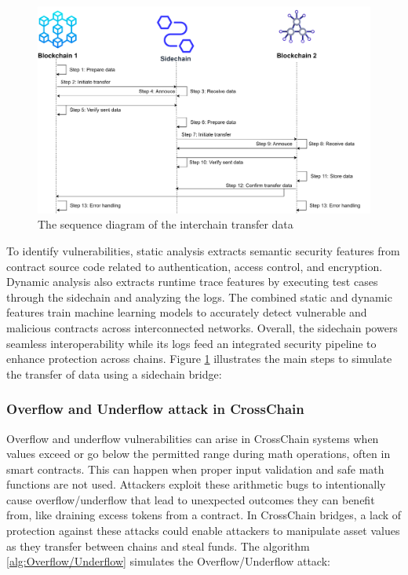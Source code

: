 \documentclass[sigconf]{acmart}
\begin{document}
\begin{figure}[h]
  \caption{The sequence diagram of the interchain transfer data}
  \label{transfer}
  \centering
  \includegraphics[width=\textwidth]{Step.png}
\end{figure}

To identify vulnerabilities, static analysis extracts semantic security features from contract source code related to authentication, access control, and encryption. Dynamic analysis also extracts runtime trace features by executing test cases through the sidechain and analyzing the logs. The combined static and dynamic features train machine learning models to accurately detect vulnerable and malicious contracts across interconnected networks. Overall, the sidechain powers seamless interoperability while its logs feed an integrated security pipeline to enhance protection across chains. Figure \ref{transfer} illustrates the main steps to simulate the transfer of data using a sidechain bridge:
\vspace{-0.5em}
\subsubsection{Overflow and Underflow attack in CrossChain}
Overflow and underflow vulnerabilities can arise in CrossChain systems when values exceed or go below the permitted range during math operations, often in smart contracts. This can happen when proper input validation and safe math functions are not used. Attackers exploit these arithmetic bugs to intentionally cause overflow/underflow that lead to unexpected outcomes they can benefit from, like draining excess tokens from a contract. In CrossChain bridges, a lack of protection against these attacks could enable attackers to manipulate asset values as they transfer between chains and steal funds. The algorithm \ref{alg:Overflow/Underflow} simulates the Overflow/Underflow attack:
\end{document}
